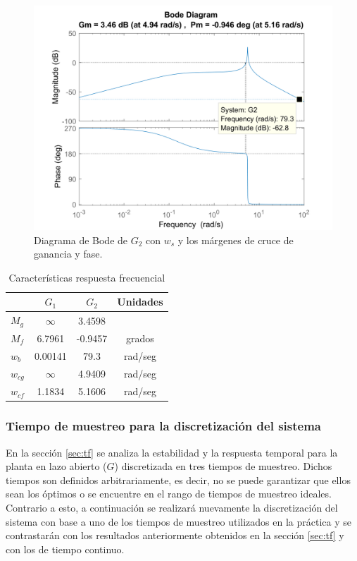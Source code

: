 \documentclass[journal]{IEEEtran}
\begin{document}
\begin{figure}[h!]
\caption{Diagrama de Bode de $G_2$ con $w_s$ y los márgenes de cruce de ganancia y fase.\label{fig:bode2}}
  \centering
\includegraphics[scale=0.25]{Bode/BodeG2.png}
\end{figure}

\begin{table}[!h]
\centering
\caption{Características respuesta frecuencial}
\label{tab:freq}
\begin{tabular}{@{}lccc@{}}
\toprule
                  & $G_1$ & $G_2$ & Unidades         \\ \midrule
$M_g$ & $\infty$ & 3.4598 & \\
$M_f$ & 6.7961 & -0.9457 & grados\\
$w_b$ & 0.00141 & 79.3 & rad/seg\\
$w_{cg}$ & $\infty$ & 4.9409 & rad/seg\\
$w_{cf}$ & 1.1834 & 5.1606 & rad/seg\\
                 \bottomrule
\end{tabular}
\end{table}

\subsubsection{Tiempo de muestreo para la discretización del sistema}
En la sección \ref{sec:tf} se analiza la estabilidad y la respuesta temporal para la planta en lazo abierto ($G$) discretizada en tres tiempos de muestreo. Dichos tiempos son definidos arbitrariamente, es decir, no se puede garantizar que ellos sean los óptimos o se encuentre en el rango de tiempos de muestreo ideales. Contrario a esto, a continuación se realizará nuevamente la discretización del sistema con base a uno de los tiempos de muestreo utilizados en la práctica y se contrastarán con los resultados anteriormente obtenidos en la sección \ref{sec:tf} y con los de tiempo continuo.\\
\end{document}
